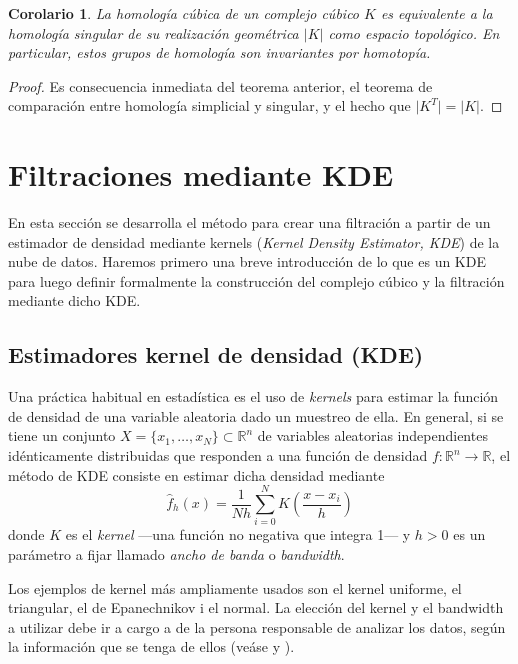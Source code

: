 \documentclass[12pt,a4paper,twoside]{article} %
\theoremstyle{plain}
\newtheorem{corolario}{Corolario}[subsection]
\theoremstyle{definition}
\newcommand{\R}{\mathbb{R}}
\newcommand{\map}[3]{#1 \colon #2 \to #3}
\newcommand*\NewPage{\newpage\null\thispagestyle{empty}\newpage}
\begin{document}
\begin{corolario}
La homología cúbica de un complejo cúbico $K$ es equivalente a la homología singular de su realización geométrica $\lvert K \rvert$ como espacio topológico. En particular, estos grupos de homología son invariantes por homotopía.
\end{corolario}

\begin{proof}
Es consecuencia inmediata del teorema anterior, el teorema de comparación entre homología simplicial y singular, y el hecho que $\lvert K^T \rvert = \lvert K \rvert$. 
\end{proof}

\newpage
\NewPage
\cleardoublepage
\section{Filtraciones mediante KDE}

%
%

En esta sección se desarrolla el método para crear una filtración a partir de un estimador de densidad mediante kernels (\emph{Kernel Density Estimator, KDE}) de la nube de datos. Haremos primero una breve introducción de lo que es un KDE para luego definir formalmente la construcción del complejo cúbico y la filtración mediante dicho KDE.

\subsection{Estimadores kernel de densidad (KDE)}

Una práctica habitual en estadística es el uso de \emph{kernels} para estimar la función de densidad de una variable aleatoria dado un muestreo de ella. En general, si se tiene un conjunto $X= \{x_1,\dots,x_N \} \subset \R^n$ de variables aleatorias independientes idénticamente distribuidas que responden a una función de densidad $\map{f}{\R^n}{\R}$, el método de KDE consiste en estimar dicha densidad mediante
$$ \hat{f}_h(x) = \frac{1}{Nh} \sum_{i=0}^N K\left( \frac{x-x_i}{h}\right) $$
donde $K$ es el \emph{kernel} ---una función no negativa que integra 1--- y $h>0$ es un parámetro a fijar llamado \emph{ancho de banda} o \emph{bandwidth}.

Los ejemplos de kernel más ampliamente usados son el kernel uniforme, el triangular, el de Epanechnikov i el normal. La elección del kernel y el bandwidth a utilizar debe ir a cargo a de la persona responsable de analizar los datos, según la información que se tenga de ellos (veáse \cite{Scheid} y \cite{Chouaib}).
\end{document}
